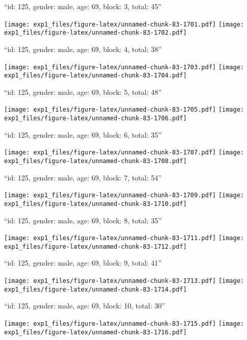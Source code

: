 \documentclass[11pt,,]{article}
\begin{document}
\newpage
[1] 

``id: 125, gender: male, age: 69, block: 3, total: 45''

\texttt{[image: exp1\_files/figure-latex/unnamed-chunk-83-1701.pdf]}
\texttt{[image: exp1\_files/figure-latex/unnamed-chunk-83-1702.pdf]}

\newpage
[1] 

``id: 125, gender: male, age: 69, block: 4, total: 38''

\texttt{[image: exp1\_files/figure-latex/unnamed-chunk-83-1703.pdf]}
\texttt{[image: exp1\_files/figure-latex/unnamed-chunk-83-1704.pdf]}

\newpage
[1] 

``id: 125, gender: male, age: 69, block: 5, total: 48''

\texttt{[image: exp1\_files/figure-latex/unnamed-chunk-83-1705.pdf]}
\texttt{[image: exp1\_files/figure-latex/unnamed-chunk-83-1706.pdf]}

\newpage
[1] 

``id: 125, gender: male, age: 69, block: 6, total: 35''

\texttt{[image: exp1\_files/figure-latex/unnamed-chunk-83-1707.pdf]}
\texttt{[image: exp1\_files/figure-latex/unnamed-chunk-83-1708.pdf]}

\newpage
[1] 

``id: 125, gender: male, age: 69, block: 7, total: 54''

\texttt{[image: exp1\_files/figure-latex/unnamed-chunk-83-1709.pdf]}
\texttt{[image: exp1\_files/figure-latex/unnamed-chunk-83-1710.pdf]}

\newpage
[1] 

``id: 125, gender: male, age: 69, block: 8, total: 35''

\texttt{[image: exp1\_files/figure-latex/unnamed-chunk-83-1711.pdf]}
\texttt{[image: exp1\_files/figure-latex/unnamed-chunk-83-1712.pdf]}

\newpage
[1] 

``id: 125, gender: male, age: 69, block: 9, total: 41''

\texttt{[image: exp1\_files/figure-latex/unnamed-chunk-83-1713.pdf]}
\texttt{[image: exp1\_files/figure-latex/unnamed-chunk-83-1714.pdf]}

\newpage
[1] 

``id: 125, gender: male, age: 69, block: 10, total: 30''

\texttt{[image: exp1\_files/figure-latex/unnamed-chunk-83-1715.pdf]}
\texttt{[image: exp1\_files/figure-latex/unnamed-chunk-83-1716.pdf]}
\end{document}

